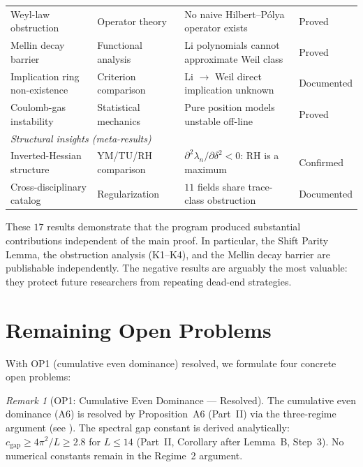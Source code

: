 \documentclass[12pt,a4paper]{article}
\theoremstyle{definition}
\theoremstyle{remark}
\newtheorem{remark}[theorem]{Remark}
\begin{document}
\begin{center}
{\begin{tabular}{p{4.2cm}|p{3.2cm}|p{4.2cm}|l}
Weyl-law obstruction & Operator theory & No naive Hilbert--P\'olya operator exists & Proved \\
Mellin decay barrier & Functional analysis & Li polynomials cannot approximate Weil class & Proved \\
Implication ring non-existence & Criterion comparison & Li $\to$ Weil direct implication unknown & Documented \\
Coulomb-gas instability & Statistical mechanics & Pure position models unstable off-line & Proved \\[4pt]
\multicolumn{4}{l}{\emph{Structural insights (meta-results)}} \\[2pt]
Inverted-Hessian structure & YM/TU/RH comparison & $\partial^2\lambda_n/\partial\delta^2 < 0$: RH is a maximum & Confirmed \\
Cross-disciplinary catalog & Regularization & $11$ fields share trace-class obstruction & Documented
\end{tabular}}
\end{center}

\noindent These $17$ results demonstrate that the program produced substantial contributions independent of the main proof. In particular, the Shift Parity Lemma, the obstruction analysis (K1--K4), and the Mellin decay barrier are publishable independently. The negative results are arguably the most valuable: they protect future researchers from repeating dead-end strategies.


\section{Remaining Open Problems}
\label{sec:open-problems}

With OP1 (cumulative even dominance) resolved, we formulate four concrete open problems:

\begin{remark}[OP1: Cumulative Even Dominance --- Resolved]
\label{rem:OP1-resolved}
The cumulative even dominance (A6) is resolved by Proposition~A6 (Part~II) via the three-regime argument (see ). The spectral gap constant is derived analytically: $c_{\mathrm{gap}} \geq 4\pi^2/L \geq 2.8$ for $L \leq 14$ (Part~II, Corollary after Lemma~B, Step~3). No numerical constants remain in the Regime~2 argument.
\end{remark}
\end{document}
